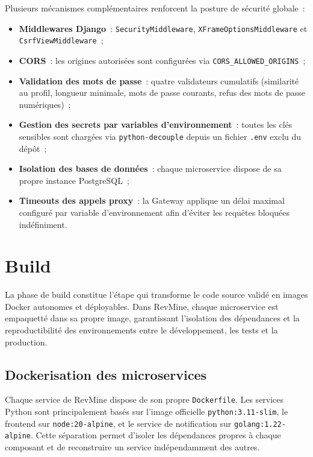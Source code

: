 Plusieurs mécanismes complémentaires renforcent la posture de sécurité globale~:
\begin{itemize}
    \item \textbf{Middlewares Django}~: \texttt{SecurityMiddleware}, \texttt{XFrameOptionsMiddleware}
          et \texttt{CsrfViewMiddleware}~;
    \item \textbf{CORS}~: les origines autorisées sont configurées via
          \texttt{CORS\_ALLOWED\_ORIGINS}~;
    \item \textbf{Validation des mots de passe}~: quatre validateurs cumulatifs (similarité au
          profil, longueur minimale, mots de passe courants, refus des mots de passe numériques)~;
    \item \textbf{Gestion des secrets par variables d'environnement}~: toutes les clés sensibles
          sont chargées via \texttt{python-decouple} depuis un fichier \texttt{.env} exclu du
          dépôt~;
    \item \textbf{Isolation des bases de données}~: chaque microservice dispose de sa propre
          instance PostgreSQL~;
    \item \textbf{Timeouts des appels proxy}~: la Gateway applique un délai maximal configuré par
          variable d'environnement afin d'éviter les requêtes bloquées indéfiniment.
\end{itemize}

\section{Build}
\label{sec:build}

La phase de build constitue l'étape qui transforme le code source validé en images Docker
autonomes et déployables. Dans RevMine, chaque microservice est empaquetté dans sa propre image,
garantissant l'isolation des dépendances et la reproductibilité des environnements entre le
développement, les tests et la production.

\subsection{Dockerisation des microservices}

Chaque service de RevMine dispose de son propre \texttt{Dockerfile}. Les services Python sont
principalement basés sur l'image officielle \texttt{python:3.11-slim}, le frontend sur
\texttt{node:20-alpine}, et le service de notification sur \texttt{golang:1.22-alpine}. Cette
séparation permet d'isoler les dépendances propres à chaque composant et de reconstruire un
service indépendamment des autres.

